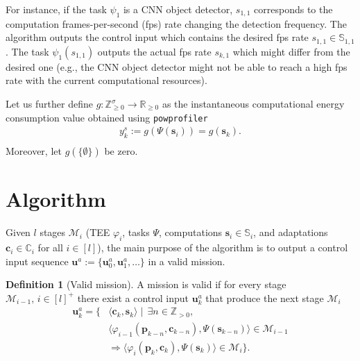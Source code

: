 \documentclass[letterpaper,10pt,conference]{ieeeconf}
\newcommand{\stt}[1]{{\small\tt #1}} %
\newcommand{\powprof}{\stt{powprofiler}}
\theoremstyle{definition}
\newtheorem{defn}{Definition}[section]
\begin{document}
For instance, if the task $\psi_1$ is a CNN object detector, $s_{1,1}$ corresponds to the computation frames-per-second (fps) rate changing the detection frequency. The algorithm outputs the control input which contains the desired fps rate $s_{1,1}\in\mathbb{S}_{1,1}$. The task $\psi_1(s_{1,1})$ outputs the actual fps rate $s_{k,1}$ which might differ from the desired one (e.g., the CNN object detector might not be able to reach a high fps rate with the current computational resources).

Let us further define $g:\mathbb{Z}_{\geq 0}^{\sigma}\rightarrow\mathbb{R}_{\geq 0}$ as the instantaneous computational energy consumption value obtained using \powprof{}
\begin{equation}\label{eq:energy-comp}\begin{split}
  y_k^s:=g\left(\Psi(\mathbf{s}_i)\right)=g\left(\mathbf{s}_{k}\right).\\
\end{split}\end{equation}
Moreover, let $g(\{\emptyset\})$ be zero.


\section{Algorithm}
\label{sec:algo}

Given $l$ stages $\mathcal{M}_i$ (TEE $\varphi_i$, tasks $\Psi$, computations $\mathbf{s}_i\in\mathbb{S}_i$, and adaptations $\mathbf{c}_i\in\mathbb{C}_i$ for all $i\in[l]$), the main purpose of the algorithm is to output a control input sequence $\mathbf{u}^a:=\{\mathbf{u}_0^a,\mathbf{u}_1^a,\dots\}$ in a valid mission.

\begin{defn}[Valid mission]\label{def:valid}
  A mission is valid if for every stage $\mathcal{M}_{i-1},\,i\in[l]^+$ there exist a control input $\mathbf{u}_k^{a}$ that produce the next stage $\mathcal{M}_i$
  \begin{equation}\begin{split}
    \mathbf{u}^a_{k}=\{&\langle\mathbf{c}_{k},\mathbf{s}_{k}\rangle\mid\,\exists n\in\mathbb{Z}_{>0},\\&\langle\varphi_{i-1}(\mathbf{p}_{k-n},\mathbf{c}_{k-n}),\Psi(\mathbf{s}_{k-n})\rangle\in\mathcal{M}_{i-1}\\
    &\Longrightarrow\langle\varphi_i(\mathbf{p}_{k},\mathbf{c}_{k}),\Psi(\mathbf{s}_{k})\rangle\in\mathcal{M}_{i}\}.
  \end{split}\end{equation}
\end{defn}
\end{document}
